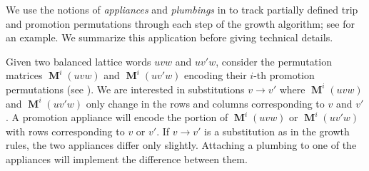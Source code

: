 \documentclass{amsart}
\theoremstyle{definition}
\theoremstyle{remark}
\numberwithin{equation}{section}
\DeclareMathOperator{\PM}{\mathbf{M}}
\begin{document}
We use the notions of \textit{appliances} and \textit{plumbings} in  to track partially defined trip and promotion permutations through each step of the growth algorithm; see  for an example. We summarize this application before giving technical details.

Given two balanced lattice words $uvw$ and $uv'w$, consider the permutation matrices $\PM^i(uvw)$ and $\PM^i(uv'w)$ encoding their $i$-th promotion permutations (see ). We are interested in substitutions $v \to v'$ where $\PM^i(uvw)$ and $\PM^i(uv'w)$ only change in the rows and columns corresponding to $v$ and $v'$. A promotion appliance will encode the portion of $\PM^i(uvw)$ or $\PM^i(uv'w)$ with rows corresponding to $v$ or $v'$. If $v \to v'$ is a substitution as in the growth rules, the two appliances differ only slightly. Attaching a plumbing to one of the appliances will implement the difference between them.
\end{document}

